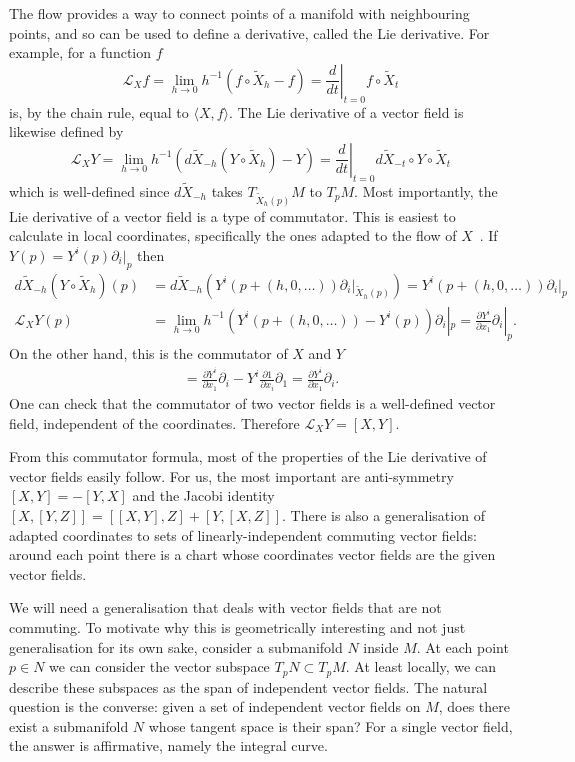 The flow provides a way to connect points of a manifold with neighbouring points, and so can be used to define a derivative, called the Lie derivative.
For example, for a function $f$
\[
\mathcal{L}_X f
= \lim_{h \to 0} h^{-1} \left( f \circ \tilde{X}_h - f \right)
= \left.\frac{d}{dt}\right|_{t=0} f \circ \tilde{X}_t
\]
is, by the chain rule, equal to $\langle X, f\rangle$.
The Lie derivative of a vector field is likewise defined by
\[
\mathcal{L}_X Y
= \lim_{h \to 0} h^{-1} \left( d\tilde{X}_{-h}(Y \circ \tilde{X}_h) - Y \right)
= \left.\frac{d}{dt}\right|_{t=0} d\tilde{X}_{-t} \circ Y \circ \tilde{X}_t
\]
which is well-defined since $d\tilde{X}_{-h}$ takes $T_{\tilde{X}_h(p)}M$ to $T_pM$.
Most importantly, the Lie derivative of a vector field is a type of commutator.
This is easiest to calculate in local coordinates, specifically the ones adapted to the flow of $X$~\cite[Thm~9.38]{Lee2012}.
If $Y(p) = Y^i(p) \partial_i|_p$ then
\begin{align*}
d\tilde{X}_{-h}(Y \circ \tilde{X}_h) (p)
&= d\tilde{X}_{-h} \left( Y^i(p + (h,0,\ldots)) \partial_i|_{\tilde{X}_h(p)} \right)
= Y^i(p + (h,0,\ldots)) \partial_i|_{p} \\
\mathcal{L}_X Y (p)
&= \lim_{h \to 0} h^{-1} \left( Y^i(p + (h,0,\ldots)) - Y^i(p) \right) \partial_i|_{p}
= \frac{\partial Y^i}{\partial x_1} \partial_i|_{p}.
\end{align*}
On the other hand, this is the commutator of $X$ and $Y$
\begin{align*}
[X,Y]
= \frac{\partial Y^i}{\partial x_1} \partial_i - Y^i\frac{\partial 1}{\partial x_i} \partial_1
= \frac{\partial Y^i}{\partial x_1} \partial_i.
\end{align*}
One can check that the commutator of two vector fields is a well-defined vector field, independent of the coordinates.
Therefore $\mathcal{L}_X Y = [X,Y]$.

From this commutator formula, most of the properties of the Lie derivative of vector fields easily follow.
For us, the most important are anti-symmetry $[X,Y] = -[Y,X]$ and the Jacobi identity $[X,[Y,Z]] = [[X,Y],Z] + [Y, [X,Z]]$.
There is also a generalisation of adapted coordinates to sets of linearly-independent commuting vector fields: around each point there is a chart whose coordinates vector fields are the given vector fields.

We will need a generalisation that deals with vector fields that are not commuting.
To motivate why this is geometrically interesting and not just generalisation for its own sake, consider a submanifold $N$ inside $M$.
At each point $p \in N$ we can consider the vector subspace $T_pN \subset T_pM$.
At least locally, we can describe these subspaces as the span of independent vector fields.
The natural question is the converse: given a set of independent vector fields on $M$, does there exist a submanifold $N$ whose tangent space is their span?
For a single vector field, the answer is affirmative, namely the integral curve.

